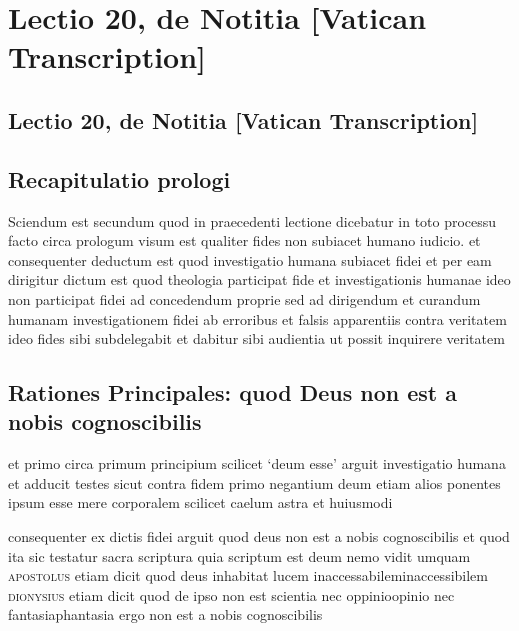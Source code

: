 \documentclass[twoside, openright]{report}
\newcommand{\name}[1]{\textsc{#1}}
\begin{document}
        \chapter*{Lectio 20, de Notitia [Vatican Transcription]}
        
         
        \beginnumbering
         \section*{Lectio 20, de Notitia [Vatican Transcription]} 
        \bigskip
         \section*{Recapitulatio prologi} 
        \pstart
        Sciendum est secundum quod in praecedenti lectione dicebatur in toto processu facto circa prologum visum est qualiter fides non subiacet humano iudicio. et consequenter deductum est quod investigatio humana subiacet fidei et per eam dirigitur dictum est quod theologia participat fide et investigationis humanae ideo non participat fidei ad concedendum proprie sed ad dirigendum et curandum humanam investigationem fidei ab erroribus et falsis apparentiis contra veritatem ideo fides sibi subdelegabit et dabitur sibi audientia ut possit inquirere veritatem
        \pend
      
        \bigskip
         \section*{Rationes Principales: quod Deus non est a nobis cognoscibilis} 
        \bigskip
         
        \pstart
        et primo circa primum principium scilicet \enquote*{deum esse} arguit investigatio humana et adducit testes sicut contra fidem primo negantium deum etiam alios ponentes ipsum esse mere corporalem scilicet caelum astra et huiusmodi 
        \pend
     
        \pstart
        consequenter ex dictis fidei arguit quod deus non est a nobis cognoscibilis et quod ita sic testatur sacra scriptura quia scriptum est deum nemo vidit umquam \name{apostolus} etiam dicit quod deus inhabitat lucem inaccessabileminaccessibilem  \name{dionysius} etiam dicit quod de ipso non est scientia nec oppinioopinio nec fantasiaphantasia ergo non est a nobis cognoscibilis
        \pend
      
\end{document}
